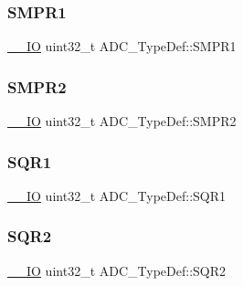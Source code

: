 \mbox{\label{struct_a_d_c___type_def_a73009a8122fcc628f467a4e997109347}} 
\subsubsection{\texorpdfstring{SMPR1}{SMPR1}}
{\footnotesize\ttfamily \mbox{\hyperlink{group___c_m_s_i_s___c_m3__core__definitions_gaec43007d9998a0a0e01faede4133d6be}{\+\_\+\+\_\+\+IO}} uint32\+\_\+t A\+D\+C\+\_\+\+Type\+Def\+::\+S\+M\+P\+R1}

\mbox{\label{struct_a_d_c___type_def_a9e68fe36c4c8fbbac294b5496ccf7130}} 
\subsubsection{\texorpdfstring{SMPR2}{SMPR2}}
{\footnotesize\ttfamily \mbox{\hyperlink{group___c_m_s_i_s___c_m3__core__definitions_gaec43007d9998a0a0e01faede4133d6be}{\+\_\+\+\_\+\+IO}} uint32\+\_\+t A\+D\+C\+\_\+\+Type\+Def\+::\+S\+M\+P\+R2}

\mbox{\label{struct_a_d_c___type_def_a0185aa54962ba987f192154fb7a2d673}} 
\subsubsection{\texorpdfstring{SQR1}{SQR1}}
{\footnotesize\ttfamily \mbox{\hyperlink{group___c_m_s_i_s___c_m3__core__definitions_gaec43007d9998a0a0e01faede4133d6be}{\+\_\+\+\_\+\+IO}} uint32\+\_\+t A\+D\+C\+\_\+\+Type\+Def\+::\+S\+Q\+R1}

\mbox{\label{struct_a_d_c___type_def_a6b6e55e6c667042e5a46a76518b73d5a}} 
\subsubsection{\texorpdfstring{SQR2}{SQR2}}
{\footnotesize\ttfamily \mbox{\hyperlink{group___c_m_s_i_s___c_m3__core__definitions_gaec43007d9998a0a0e01faede4133d6be}{\+\_\+\+\_\+\+IO}} uint32\+\_\+t A\+D\+C\+\_\+\+Type\+Def\+::\+S\+Q\+R2}

